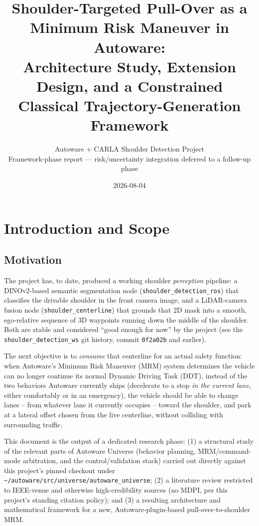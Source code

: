 \documentclass[11pt]{article}
\title{Shoulder-Targeted Pull-Over as a Minimum Risk Maneuver in Autoware:\\
Architecture Study, Extension Design, and a Constrained\\
Classical Trajectory-Generation Framework}
\author{Autoware + CARLA Shoulder Detection Project \\ \small Framework-phase report --- risk/uncertainty integration deferred to a follow-up phase}
\date{2026-08-04}
\newcommand{\code}[1]{\texttt{#1}}
\newcommand{\pkg}[1]{\texttt{#1}}
\begin{document}
\maketitle
\tableofcontents

\section{Introduction and Scope}

\subsection{Motivation}
The project has, to date, produced a working shoulder \emph{perception} pipeline: a DINOv2-based
semantic segmentation node (\pkg{shoulder\_detection\_ros}) that classifies the drivable shoulder
in the front camera image, and a LiDAR-camera fusion node (\pkg{shoulder\_centerline}) that grounds
that 2D mask into a smooth, ego-relative sequence of 3D waypoints running down the middle of the
shoulder. Both are stable and considered ``good enough for now'' by the project (see the
\pkg{shoulder\_detection\_ws} git history, commit \code{0f2a02b} and earlier).

The next objective is to \emph{consume} that centerline for an actual safety function: when
Autoware's Minimum Risk Maneuver (MRM) system determines the vehicle can no longer continue its
normal Dynamic Driving Task (DDT), instead of the two behaviors Autoware currently ships
(decelerate to a stop \emph{in the current lane}, either comfortably or in an emergency), the
vehicle should be able to change lanes -- from whatever lane it currently occupies -- toward the
shoulder, and park at a lateral offset chosen from the live centerline, without colliding with
surrounding traffic.

This document is the output of a dedicated research phase: (1) a structural study of the relevant
parts of Autoware Universe (behavior planning, MRM/command-mode arbitration, and the
control/validation stack) carried out directly against this project's pinned checkout under
\code{\textasciitilde/autoware/src/universe/autoware\_universe}; (2) a literature review restricted
to IEEE-venue and otherwise high-credibility sources (no MDPI, per this project's standing
citation policy); and (3) a resulting architecture and mathematical framework for a new,
Autoware-plugin-based pull-over-to-shoulder MRM.
\end{document}
